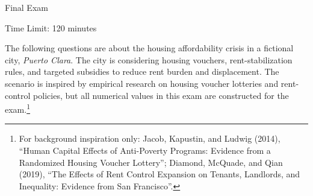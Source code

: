 \documentclass[11pt]{exam}
\newcommand{\exam}{Final Exam}
\begin{document}
\begin{center}

    {\Huge \exam{}}
    \vspace{0.7cm}

    \begin{flushright}
        Time Limit: 120 minutes
    \end{flushright}
    \vspace{-0.2cm}

\end{center}
\vspace{0.3cm}
The following questions are about the housing affordability crisis in a fictional city, \textit{Puerto Clara}. The city is considering housing vouchers, rent-stabilization rules, and targeted subsidies to reduce rent burden and displacement. The scenario is inspired by empirical research on housing voucher lotteries and rent-control policies, but all numerical values in this exam are constructed for the exam.\footnote{For background inspiration only: Jacob, Kapustin, and Ludwig (2014), ``Human Capital Effects of Anti-Poverty Programs: Evidence from a Randomized Housing Voucher Lottery''; Diamond, McQuade, and Qian (2019), ``The Effects of Rent Control Expansion on Tenants, Landlords, and Inequality: Evidence from San Francisco''.}
\end{document}
